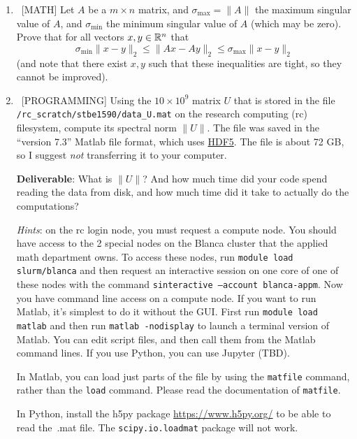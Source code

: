 \documentclass[10pt, letterpaper]{scrartcl}
\begin{document}
\begin{enumerate}[align=left, leftmargin=*, label=\bfseries Problem \arabic*:]   
 
    \item \ [MATH] Let $A$ be a $m \times n$ matrix, and $\sigma_{\max} = \|A\|$ the maximum singular value of $A$, and $\sigma_{\min}$ the minimum singular value of $A$ (which may be zero).  Prove that for all vectors $x,y\in \mathbb{R}^n$ that 
    \[
    \sigma_{\min} \| x-y\|_2 \le \|Ax-Ay\|_2 \le \sigma_{\max}\|x-y\|_2
    \]
    (and note that there exist $x,y$ such that these inequalities are tight, so they cannot be improved).
         
    \item \ [PROGRAMMING] Using the $10 \times 10^9$ matrix $U$ that is stored in the file \\ \texttt{/rc\_scratch/stbe1590/data\_U.mat} on the research computing (rc) filesystem, compute its spectral norm $\|U\|$.
    The file was saved in the ``version 7.3'' Matlab file format, which uses \href{https://www.hdfgroup.org/}{HDF5}.  The file is about 72 GB, so I suggest \emph{not} transferring it to your computer.

    \textbf{Deliverable}: What is $\|U\|$? And how much time did your code spend reading the data from disk, and how much time did it take to actually do the computations?
    
    \emph{Hints}: on the rc login node, you must request a compute node. You should have access to the 2 special nodes on the Blanca cluster that the applied math department owns. To access these nodes, run \texttt{module load slurm/blanca} and then request an interactive session on one core of one of these nodes with the command \texttt{sinteractive --account blanca-appm}.  Now you have command line access on a compute node.  If you want to run Matlab, it's simplest to do it without the GUI.  First run \texttt{module load matlab} and then run \texttt{matlab -nodisplay} to launch a terminal version of Matlab. You can edit script files, and then call them from the Matlab command lines.  If you use Python, you can use Jupyter (TBD).
    
    
    In Matlab, you can load just parts of the file by using the \texttt{matfile} command, rather than the \texttt{load} command. Please read the documentation of \texttt{matfile}.
    
    In Python, install the h5py package \url{https://www.h5py.org/} to be able to read the\ .mat file. The \texttt{scipy.io.loadmat} package will not work.
    

\end{enumerate}
\end{document}
